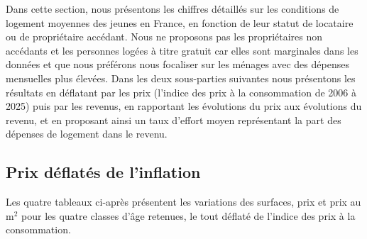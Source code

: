 \documentclass[12pt,a4paper]{article}
\begin{document}
	Dans cette section, nous présentons les chiffres détaillés sur les conditions de logement moyennes des jeunes en France, en fonction de leur statut de locataire ou de propriétaire accédant. Nous ne proposons pas les propriétaires non accédants et les personnes logées à titre gratuit car elles sont marginales dans les données et que nous préférons nous focaliser sur les ménages avec des dépenses mensuelles plus élevées. Dans les deux sous-parties suivantes nous présentons les résultats en déflatant par les prix (l'indice des prix à la consommation de 2006 à 2025) puis par les revenus, en rapportant les évolutions du prix aux évolutions du revenu, et en proposant ainsi un taux d'effort moyen représentant la part des dépenses de logement dans le revenu. 
	
	\subsection{Prix déflatés de l'inflation}\label{annexe1a}
	
	Les quatre tableaux ci-après présentent les variations des surfaces, prix et prix au m$^2$ pour les quatre classes d'âge retenues, le tout déflaté de l'indice des prix à la consommation. 
	
\end{document}
